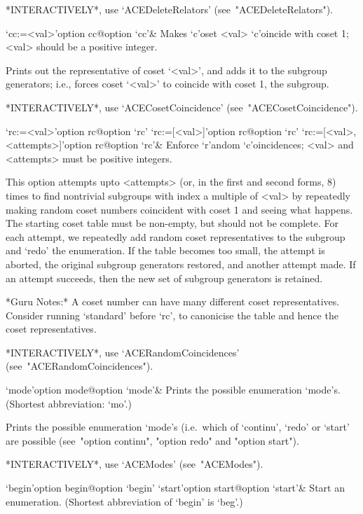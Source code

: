 *INTERACTIVELY*, use `ACEDeleteRelators' (see~"ACEDeleteRelators").

\>`cc:=<val>'{option cc}@{option `cc'}&
Makes `c'oset <val>  `c'oincide  with  coset  1;  <val>  should  be  a
positive integer.

Prints out the representative of coset `<val>', and  adds  it  to  the
subgroup generators; i.e., forces coset `<val>' to coincide with coset
1, the subgroup.

*INTERACTIVELY*,               use               `ACECosetCoincidence'
(see~"ACECosetCoincidence").

\>`rc:=<val>'{option rc}@{option `rc'}
\>`rc:=[<val>]'{option rc}@{option `rc'}
\>`rc:=[<val>, <attempts>]'{option rc}@{option `rc'}&
Enforce `r'andom `c'oincidences; <val> and <attempts> must be positive
integers.

This option attempts upto <attempts> (or,  in  the  first  and  second
forms, 8) times to find nontrivial subgroups with index a multiple  of
<val> by repeatedly making random coset numbers coincident with  coset
1 and seeing what happens. The starting coset table must be non-empty,
but should not be complete. For each attempt, we repeatedly add random
coset representatives to the subgroup and `redo' the  enumeration.  If
the table becomes too small, the  attempt  is  aborted,  the  original
subgroup generators restored, and another attempt made. If an  attempt
succeeds, then the new set of subgroup generators is retained.

*Guru Notes:*
A coset number can have many different coset representatives. Consider
running `standard' before `rc', to canonicise the table and hence  the
coset representatives.

*INTERACTIVELY*,              use              `ACERandomCoincidences'
(see~"ACERandomCoincidences").

\enditems


\beginitems

\>`mode'{option mode}@{option `mode'}&
Prints the possible enumeration `mode's.
(Shortest abbreviation: `mo'.)

Prints the possible  enumeration  `mode's  (i.e.~which  of  `continu',
`redo' or `start' are possible (see~"option  continu",  "option  redo"
and "option start").

*INTERACTIVELY*, use `ACEModes' (see~"ACEModes").

\>`begin'{option begin}@{option `begin'}
\>`start'{option start}@{option `start'}&
Start an enumeration. (Shortest abbreviation of `begin' is `beg'.)

